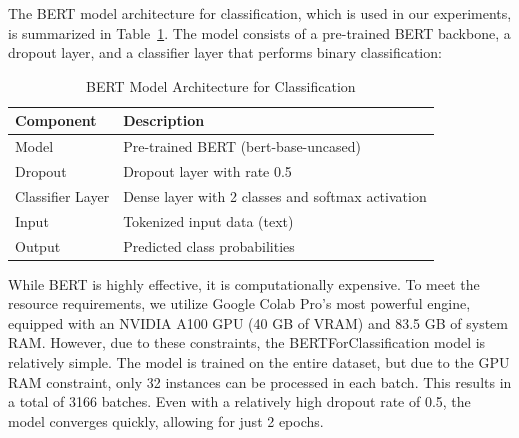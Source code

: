 \newpage

The BERT model architecture for classification, which is used in our experiments, is summarized in Table~\ref{tab:bert_architecture}. The model consists of a pre-trained BERT backbone, a dropout layer, and a classifier layer that performs binary classification:

\vspace{3mm} 

\begin{table}[h!]
\centering
\renewcommand{\arraystretch}{1.3} %
\begin{tabular}{ll}
\hline
\textbf{Component}    & \textbf{Description}                        \\ \hline
Model                & Pre-trained BERT (bert-base-uncased)       \\ 
Dropout              & Dropout layer with rate 0.5                \\ 
Classifier Layer     & Dense layer with 2 classes and softmax activation \\ 
Input                & Tokenized input data (text)               \\ 
Output               & Predicted class probabilities              \\ \hline
\end{tabular}
\caption{BERT Model Architecture for Classification}
\label{tab:bert_architecture}
\end{table}

\vspace{3mm} 

While BERT is highly effective, it is computationally expensive. To meet the resource requirements, we utilize Google Colab Pro's most powerful engine, equipped with an NVIDIA A100 GPU (40 GB of VRAM) and 83.5 GB of system RAM. However, due to these constraints, the BERTForClassification model is relatively simple. The model is trained on the entire dataset, but due to the GPU RAM constraint, only 32 instances can be processed in each batch. This results in a total of 3166 batches. Even with a relatively high dropout rate of 0.5, the model converges quickly, allowing for just 2 epochs.

\vspace{3mm} 





